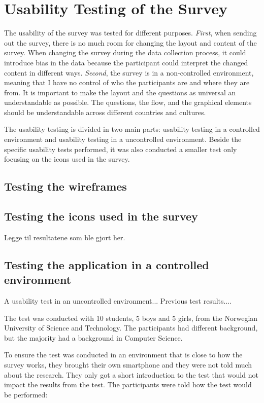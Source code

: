 \section{Usability Testing of the Survey}

  The usability of the survey was tested for different purposes. {\it First}, when sending out the survey, there is no much room for changing the layout and content of the survey. When changing the survey during the data collection process, it could introduce bias in the data because the participant could interpret the changed content in different ways. {\it Second}, the survey is in a non-controlled environment, meaning that I have no control of who the participants are and where they are from. It is important to make the layout and the questions as universal an understandable as possible. The questions, the flow, and the graphical elements should be understandable across different countries and cultures. 

  The usability testing is divided in two main parts: usability testing in a controlled environment and usability testing in a uncontrolled environment. Beside the specific usability tests performed, it was also conducted a smaller test only focusing on the icons used in the survey.

    \subsection{Testing the wireframes}
      

    \subsection{Testing the icons used in the survey}
      Legge til resultatene som ble gjort her.

  	\subsection{Testing the application in a controlled environment}
    A usability test in an uncontrolled environment...
    Previous test results....

    The test was conducted with 10 students, 5 boys and 5 girls, from the Norwegian University of Science and Technology. The participants had different background, but the majority had a background in Computer Science.

    To ensure the test was conducted in an environment that is close to how the survey works, they brought their own smartphone and they were not told much about the research. They only got a short introduction to the test that would not impact the results from the test. The participants were told how the test would be performed:

